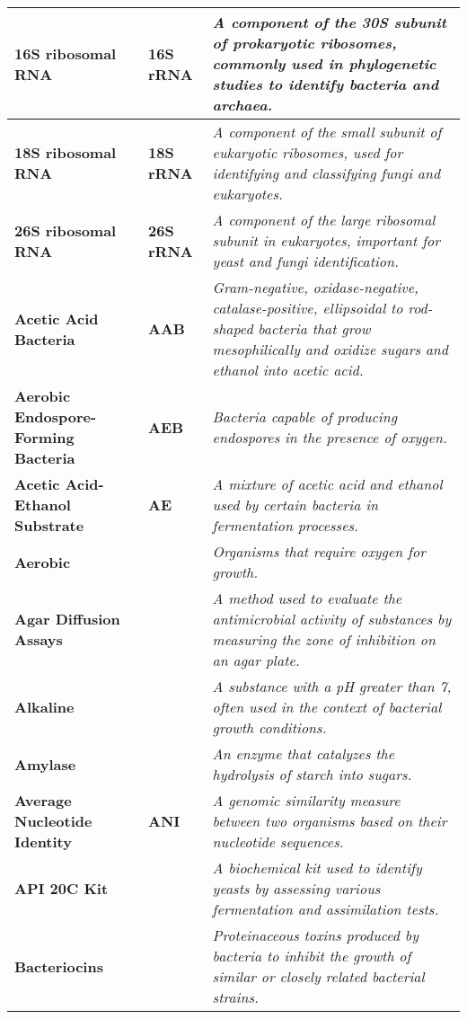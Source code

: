\begin{longtable}{| p{5cm} | p{2cm} | p{7.5cm} |}
    \textbf{16S ribosomal RNA} & \textbf{16S rRNA} & \textit{A component of the 30S subunit of prokaryotic ribosomes, commonly used in phylogenetic studies to identify bacteria and archaea.} \\
    \hline
    \textbf{18S ribosomal RNA} & \textbf{18S rRNA} & \textit{A component of the small subunit of eukaryotic ribosomes, used for identifying and classifying fungi and eukaryotes.} \\
    \hline
    \textbf{26S ribosomal RNA} & \textbf{26S rRNA} & \textit{A component of the large ribosomal subunit in eukaryotes, important for yeast and fungi identification.} \\
    \hline
    \textbf{Acetic Acid Bacteria} & \textbf{AAB} & \textit{Gram-negative, oxidase-negative, catalase-positive, ellipsoidal to rod-shaped bacteria that grow mesophilically and oxidize sugars and ethanol into acetic acid.} \\
    \hline
    \textbf{Aerobic Endospore-Forming Bacteria} & \textbf{AEB} & \textit{Bacteria capable of producing endospores in the presence of oxygen.} \\
    \hline
    \textbf{Acetic Acid-Ethanol Substrate} & \textbf{AE} & \textit{A mixture of acetic acid and ethanol used by certain bacteria in fermentation processes.} \\
    \hline
    \textbf{Aerobic} &  & \textit{Organisms that require oxygen for growth.} \\
    \hline
    \textbf{Agar Diffusion Assays} &  & \textit{A method used to evaluate the antimicrobial activity of substances by measuring the zone of inhibition on an agar plate.} \\
    \hline
    \textbf{Alkaline} &  & \textit{A substance with a pH greater than 7, often used in the context of bacterial growth conditions.} \\
    \hline
    \textbf{Amylase} &  & \textit{An enzyme that catalyzes the hydrolysis of starch into sugars.} \\
    \hline
    \textbf{Average Nucleotide Identity} & \textbf{ANI} & \textit{A genomic similarity measure between two organisms based on their nucleotide sequences.} \\
    \hline
    \textbf{API 20C Kit} &  & \textit{A biochemical kit used to identify yeasts by assessing various fermentation and assimilation tests.} \\
    \hline
    \textbf{Bacteriocins} &  & \textit{Proteinaceous toxins produced by bacteria to inhibit the growth of similar or closely related bacterial strains.} \\

\end{longtable}
